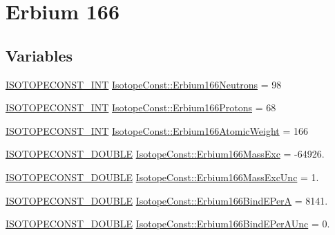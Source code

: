\hypertarget{group___isotope_const-_erbium-_er166}{}\section{Erbium 166}
\label{group___isotope_const-_erbium-_er166}
\subsection*{Variables}
\begin{DoxyCompactItemize}
\item 
\mbox{\hyperlink{group___isotope_const-_macros_ga5f18360b3e99483a35c32d789e62621c}{I\+S\+O\+T\+O\+P\+E\+C\+O\+N\+S\+T\+\_\+\+I\+NT}} \mbox{\hyperlink{group___isotope_const-_erbium-_er166_ga3ab56a9f18e031ac4994b84ed3e4c48d}{Isotope\+Const\+::\+Erbium166\+Neutrons}} = 98
\item 
\mbox{\hyperlink{group___isotope_const-_macros_ga5f18360b3e99483a35c32d789e62621c}{I\+S\+O\+T\+O\+P\+E\+C\+O\+N\+S\+T\+\_\+\+I\+NT}} \mbox{\hyperlink{group___isotope_const-_erbium-_er166_ga398930b274df2f3959efec305dd7c4c6}{Isotope\+Const\+::\+Erbium166\+Protons}} = 68
\item 
\mbox{\hyperlink{group___isotope_const-_macros_ga5f18360b3e99483a35c32d789e62621c}{I\+S\+O\+T\+O\+P\+E\+C\+O\+N\+S\+T\+\_\+\+I\+NT}} \mbox{\hyperlink{group___isotope_const-_erbium-_er166_ga8fb1ef5299fd2909bfe9fede91c3a0c9}{Isotope\+Const\+::\+Erbium166\+Atomic\+Weight}} = 166
\item 
\mbox{\hyperlink{group___isotope_const-_macros_ga8f45a7272ce02c0b4c65c44636ed719a}{I\+S\+O\+T\+O\+P\+E\+C\+O\+N\+S\+T\+\_\+\+D\+O\+U\+B\+LE}} \mbox{\hyperlink{group___isotope_const-_erbium-_er166_ga5c2be6e42ba2cfcada2ac979172ff19b}{Isotope\+Const\+::\+Erbium166\+Mass\+Exc}} = -\/64926.
\item 
\mbox{\hyperlink{group___isotope_const-_macros_ga8f45a7272ce02c0b4c65c44636ed719a}{I\+S\+O\+T\+O\+P\+E\+C\+O\+N\+S\+T\+\_\+\+D\+O\+U\+B\+LE}} \mbox{\hyperlink{group___isotope_const-_erbium-_er166_ga292a5d9ad54755ea2759c5b4d6e169ab}{Isotope\+Const\+::\+Erbium166\+Mass\+Exc\+Unc}} = 1.
\item 
\mbox{\hyperlink{group___isotope_const-_macros_ga8f45a7272ce02c0b4c65c44636ed719a}{I\+S\+O\+T\+O\+P\+E\+C\+O\+N\+S\+T\+\_\+\+D\+O\+U\+B\+LE}} \mbox{\hyperlink{group___isotope_const-_erbium-_er166_gacd64d0ea745dfdd40eb74ee2764c8688}{Isotope\+Const\+::\+Erbium166\+Bind\+E\+PerA}} = 8141.
\item 
\mbox{\hyperlink{group___isotope_const-_macros_ga8f45a7272ce02c0b4c65c44636ed719a}{I\+S\+O\+T\+O\+P\+E\+C\+O\+N\+S\+T\+\_\+\+D\+O\+U\+B\+LE}} \mbox{\hyperlink{group___isotope_const-_erbium-_er166_ga42ca8eca0fe8b4b1a96c4f6c265a15d1}{Isotope\+Const\+::\+Erbium166\+Bind\+E\+Per\+A\+Unc}} = 0.

\end{DoxyCompactItemize}
